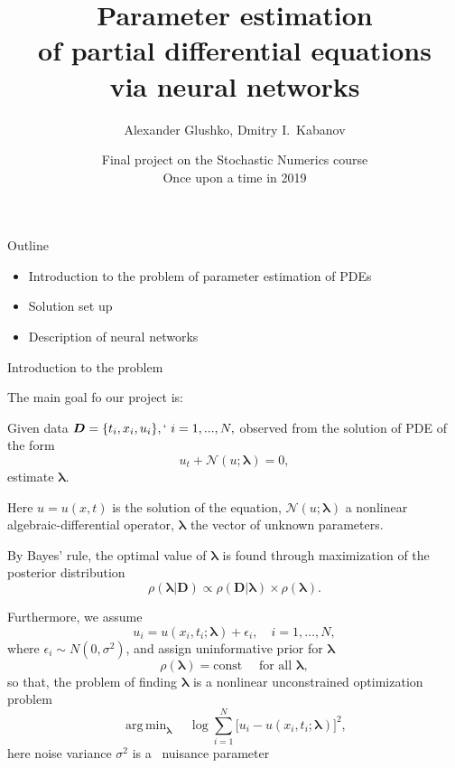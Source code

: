 \documentclass{beamer}
\title{Parameter estimation\\of partial differential equations\\via neural networks}
\author{Alexander Glushko, Dmitry I.\ Kabanov}
\date{Final project on the Stochastic Numerics course\\Once upon a time in 2019}
\newcommand{\Data}{\vec{D}}
\renewcommand{\vec}[1]{\boldsymbol{#1}}
\newcommand{\VLambda}{\ensuremath{\vec{\lambda}}}
\DeclareMathOperator*{\argmin}{arg\,min}
\newcommand{\NonlinOp}{\mathcal N\!}
\begin{document}
\maketitle

\begin{frame}{Outline}
\begin{itemize}
    \item Introduction to the problem of parameter estimation of PDEs
    \item Solution set up
    \item Description of neural networks
\end{itemize}
\end{frame}

\begin{frame}{Introduction to the problem}

The main goal fo our project is:

Given data $\vec{D} = \{t_i, x_i, u_i\},`~i = 1, ..., N,$ observed from the solution of PDE of the form
\begin{equation}
    \label{eq:pde}
    u_t + \mathcal N\!(u; \VLambda) = 0,
\end{equation}
estimate $\VLambda$.

Here $u=u(x, t)$ is the solution of the equation,
$\NonlinOp(u; \VLambda)$ a nonlinear algebraic-differential operator,
$\VLambda$ the vector of unknown parameters.

\end{frame}

\begin{frame}

By Bayes' rule, the optimal value of $\VLambda$ is found through
maximization of the posterior distribution \cite{sivia2006data}
\begin{equation}
    \rho( \VLambda | \Data ) \propto
    \rho( \Data | \VLambda ) \times \rho( \VLambda ).
\end{equation}

Furthermore, we assume
\begin{equation}
    u_i = u(x_i, t_i; \VLambda) + \epsilon_i, \quad i=1, \dots, N,
\end{equation}
where $\epsilon_i \sim N(0, \sigma^2)$, and assign uninformative prior for $\VLambda$
\begin{equation}
    \rho(\vec{\lambda}) = \text{const} \quad \text{ for all } \vec{\lambda},
\end{equation}
so that, the problem of finding $\VLambda$ is a nonlinear unconstrained
optimization problem
\begin{equation}
    \label{eq:optim-ideal}
    \argmin_{\VLambda} \quad 
    \log \sum_{i=1}^{N} \big[ u_i - u(x_i, t_i; \VLambda) \big]^2,
\end{equation}
here noise variance $\sigma^2$ is a~
nuisance parameter~\cite[section~8.2]{sivia2006data}
    
\end{frame}
\end{document}
